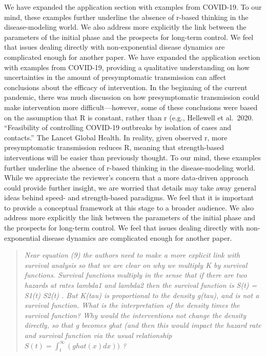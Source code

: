 We have expanded the application section with examples from COVID-19. To
our mind, these examples further underline the absence of r-based
thinking in the disease-modeling world. We also address more explicitly
the link between the parameters of the initial phase and the prospects
for long-term control. We feel that issues dealing directly with
non-exponential disease dynamics are complicated enough for another
paper.
We have expanded the
application section with examples from COVID-19, providing a qualitative
understanding on how uncertainties in the amount of presymptomatic
transmission can affect conclusions about the efficacy of intervention.
In the beginning of the current pandemic, there was much discussion on
how presymptomatic transmission could make intervention more
difficult---however, some of these conclusions were based on the
assumption that R is constant, rather than r (e.g., Hellewell et
al.~2020. ``Feasibility of controlling COVID-19 outbreaks by isolation
of cases and contacts.'' The Lancet Global Health. In reality, given
observed r, more presymptomatic transmission reduces R, meaning that
strength-based interventions will be easier than previously thought. To
our mind, these examples further underline the absence of r-based
thinking in the disease-modeling world. While we appreciate the
reviewer's concern that a more data-driven approach could provide
further insight, we are worried that details may take away general ideas
behind speed- and strength-based paradigms. We feel that it is important
to provide a conceptual framework at this stage to a broader audience.
We also address more explicitly the link between the parameters of the
initial phase and the prospects for long-term control. We feel that
issues dealing directly with non-exponential disease dynamics are
complicated enough for another paper.

\begin{quote}\sl
Near equation (9) the authors need to make a more explicit link with
survival analysis so that we are clear on why we multiply K by survival
functions. Survival functions multiply in the sense that if there are
two hazards at rates lambda1 and lambda2 then the survival function is
S(t) = S1(t) S2(t) . But K(tau) is proportional to the density g(tau),
and is not a survival function. What is the interpretation of the
density times the survival function? Why would the interventions not
change the density directly, so that g becomes ghat (and then this would
impact the hazard rate and survival function via the usual relationship
$S(t) = \int_t ^\infty ( ghat (x) dx )  )$ ?
\end{quote}

